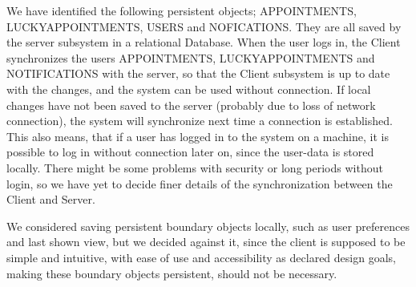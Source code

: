 We have identified the following persistent objects; APPOINTMENTS, LUCKYAPPOINTMENTS, USERS and NOFICATIONS. They are all saved by the server subsystem in a relational Database. When the user logs in, the Client synchronizes the users APPOINTMENTS, LUCKYAPPOINTMENTS and NOTIFICATIONS with the server, so that the Client subsystem is up to date with the changes, and the system can be used without connection. If local changes have not been saved to the server (probably due to loss of network connection), the system will synchronize next time a connection is established. This also means, that if a user has logged in to the system on a machine, it is possible to log in without connection later on, since the user-data is stored locally. There might be some problems with security or long periods without login, so we have yet to decide finer details of the synchronization between the Client and Server.

We considered saving persistent boundary objects locally, such as user preferences and last shown view, but we decided against it, since the client is supposed to be simple and intuitive, with ease of use and accessibility as declared design goals, making these boundary objects persistent, should not be necessary. 
